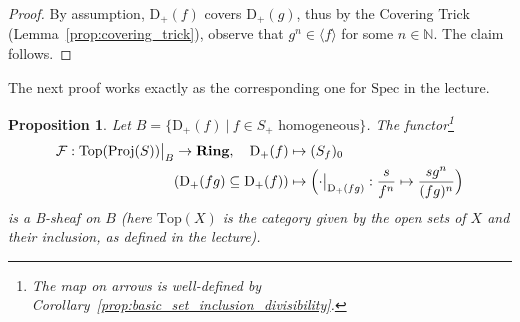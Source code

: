 \documentclass{scrartcl}
\newcommand{\N}{\mathbb{N}}
\newcommand{\D}[1]{\mathrm{D}_+(#1)}
\newcommand{\Ring}{\mathrm{\textbf{Ring}}}
\newcommand{\Top}{\mathrm{Top}}
\newcommand{\Spec}{\mathrm{Spec}}
\newcommand{\Proj}{\mathrm{Proj}}
\newcommand\restr[2]{{
    \left.\kern-\nulldelimiterspace
    #1
    \vphantom{\big|}
    \right|_{#2}
}}
\newtheorem{prop}[subsection]{Proposition}
\theoremstyle{definition}
\begin{document}
\begin{proof}
    By assumption, $\D{f}$ covers $\D{g}$, thus by the Covering Trick (Lemma~\ref{prop:covering_trick}), observe that $g^n \in \langle f \rangle$ for some $n \in \N$.
    The claim follows.
\end{proof}
The next proof works exactly as the corresponding one for $\Spec$ in the lecture.
\begin{prop}
    Let $B = \{ \D{f} \ | \ \text{$f \in S_+$ homogeneous}\}$.
    The functor\footnote{The map on arrows is well-defined by Corollary~\ref{prop:basic_set_inclusion_divisibility}.}
    \begin{align*}
        \mathcal{F}: \restr{\Top(\Proj(S))}{B} \to \Ring, \quad \D{f} &\mapsto (S_f)_0 \\
        (\D{fg} \subseteq \D{f}) &\mapsto \Bigl( \restr{\cdot}{\D{fg}}: \frac s {f^n} \mapsto \frac {sg^n} {(fg)^n} \Bigr)
    \end{align*}
    is a B-sheaf on $B$ (here $\Top(X)$ is the category given by the open sets of $X$ and their inclusion, as defined in the lecture).
\end{prop}
\end{document}
